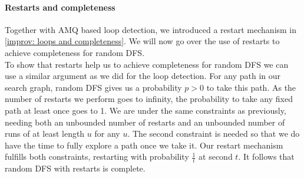 \paragraph{Restarts and completeness}
Together with AMQ based loop detection, we introduced a restart mechanism in \ref{improv: loops and completeness}. We will now go over the use of restarts to achieve completeness for random DFS. \\
To show that restarts help us to achieve completeness for random DFS we can use a similar argument as we did for the loop detection. For any path in our search graph, random DFS gives us a probability $p > 0$ to take this path. As the number of restarts we perform goes to infinity, the probability to take any fixed path at least once goes to 1. We are under the same constraints as previously, needing both an unbounded number of restarts and an unbounded number of runs of at least length $u$ for any $u$. The second constraint is needed so that we do have the time to fully explore a path once we take it. Our restart mechanism fulfills both constraints, restarting with probability $\frac{1}{t}$ at second $t$. It follows that random DFS with restarts is complete.


